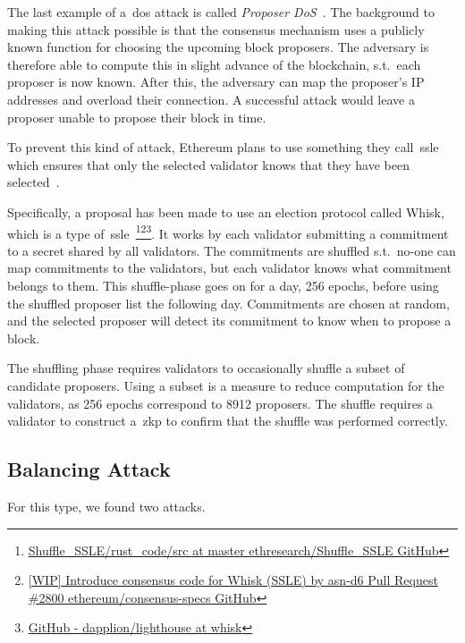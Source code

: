 The last example of a~\gls{dos} attack is called \textit{Proposer DoS}~\cite{EthereumSSLE2024,EthereumAttackDefense2024}.
The background to making this attack possible is
that the consensus mechanism uses a publicly known function for choosing the upcoming block proposers.
The adversary is therefore able to compute this in slight advance of the blockchain, s.t.\ each proposer is now known.
After this, the adversary can map the proposer's IP addresses and overload their connection.
A successful attack would leave a proposer unable to propose their block in time.

To prevent this kind of attack,
Ethereum plans
to use something they call~\gls{ssle} which ensures
that only the selected validator knows that they have been selected~\cite{EthereumSSLE2024,EthereumResearchSSLE2024}.

Specifically, a proposal has been made to use an election protocol called Whisk, which is a type of~\gls{ssle}~\cite{Whisk2024}\footnote{\href{https://github.com/ethresearch/Shuffle_SSLE/tree/master/rust_code/src}{Shuffle\_SSLE/rust\_code/src at master ethresearch/Shuffle\_SSLE GitHub}}\footnote{\href{https://github.com/ethereum/consensus-specs/pull/2800}{[WIP] Introduce consensus code for Whisk (SSLE) by asn-d6 Pull Request \#2800 ethereum/consensus-specs GitHub}}\footnote{\href{https://github.com/dapplion/lighthouse/tree/whisk}{GitHub - dapplion/lighthouse at whisk}}.
It works by each validator submitting a commitment to a secret shared by all validators.
The commitments are shuffled s.t.\ no-one can map commitments to the validators,
but each validator knows what commitment belongs to them.
This shuffle-phase goes on for a day, 256 epochs, before using the shuffled proposer list the following day.
Commitments are chosen at random, and the selected proposer will detect its commitment to know when to propose a block.

The shuffling phase requires validators to occasionally shuffle a subset of candidate proposers.
Using a subset is a measure to reduce computation for the validators, as 256 epochs correspond to 8912 proposers.
The shuffle requires a validator to construct a~\gls{zkp} to confirm that the shuffle was performed correctly.

\subsection{Balancing Attack}\label{subsec:balancing-attack}
For this type, we found two attacks.

